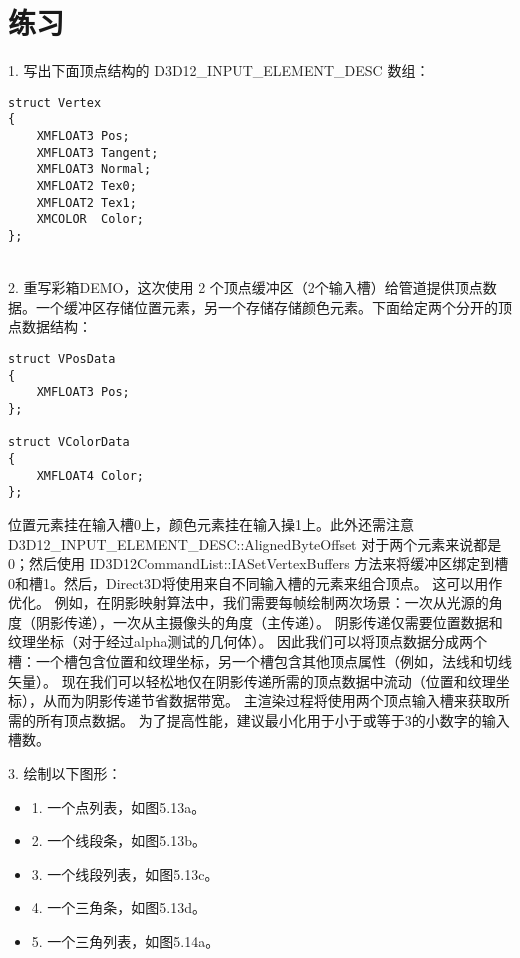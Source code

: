 \section{练习}
\begin{flushleft}
1. 写出下面顶点结构的 D3D12\_INPUT\_ELEMENT\_DESC 数组：
\end{flushleft}
\begin{lstlisting}
struct Vertex
{
    XMFLOAT3 Pos;
    XMFLOAT3 Tangent;
    XMFLOAT3 Normal;
    XMFLOAT2 Tex0;
    XMFLOAT2 Tex1;
    XMCOLOR  Color;
};
\end{lstlisting}
\begin{flushleft}

\begin{flushleft}
~\\
2. 重写彩箱DEMO，这次使用 2 个顶点缓冲区（2个输入槽）给管道提供顶点数据。一个缓冲区存储位置元素，另一个存储存储颜色元素。下面给定两个分开的顶点数据结构：\\
\end{flushleft}
\begin{lstlisting}
struct VPosData
{
    XMFLOAT3 Pos;
};

struct VColorData
{
    XMFLOAT4 Color;
};
\end{lstlisting}
\begin{flushleft}
位置元素挂在输入槽0上，颜色元素挂在输入操1上。此外还需注意 D3D12\_INPUT\_ELEMENT\_DESC::AlignedByteOffset 对于两个元素来说都是0；然后使用 ID3D12CommandList::IASetVertexBuffers 方法来将缓冲区绑定到槽0和槽1。然后，Direct3D将使用来自不同输入槽的元素来组合顶点。 这可以用作优化。 例如，在阴影映射算法中，我们需要每帧绘制两次场景：一次从光源的角度（阴影传递），一次从主摄像头的角度（主传递）。 阴影传递仅需要位置数据和纹理坐标（对于经过alpha测试的几何体）。 因此我们可以将顶点数据分成两个槽：一个槽包含位置和纹理坐标，另一个槽包含其他顶点属性（例如，法线和切线矢量）。 现在我们可以轻松地仅在阴影传递所需的顶点数据中流动（位置和纹理坐标），从而为阴影传递节省数据带宽。 主渲染过程将使用两个顶点输入槽来获取所需的所有顶点数据。 为了提高性能，建议最小化用于小于或等于3的小数字的输入槽数。\\
\end{flushleft}

\begin{flushleft}
3. 绘制以下图形：\\
\begin{itemize}
  \item 1. 一个点列表，如图5.13a。
  \item 2. 一个线段条，如图5.13b。
  \item 3. 一个线段列表，如图5.13c。
  \item 4. 一个三角条，如图5.13d。
  \item 5. 一个三角列表，如图5.14a。
\end{itemize}
\end{flushleft}


\end{flushleft}
